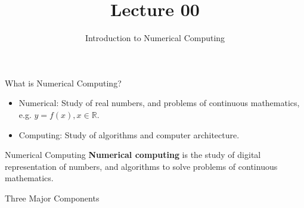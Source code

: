 \documentclass[10pt]{beamer}
\title[Math/CS 375]{Lecture 00}
\subtitle{Introduction to Numerical Computing}
\begin{document}
\begin{frame}
  \titlepage
\end{frame}
\begin{frame}{What is Numerical Computing?}
\begin{itemize}
    \item Numerical: Study of real numbers, and problems of continuous mathematics, e.g. $y=f(x), x\in \mathbb{R}$.\\[5mm]
    \item Computing: Study of algorithms and computer architecture.\\[5mm]
\end{itemize}
\begin{block}{Numerical Computing}
\textbf{Numerical computing} is the study of digital representation of numbers, and algorithms to solve problems of continuous mathematics.    
\end{block}
\end{frame}

\begin{frame}{Three Major Components}
\centering
{}

\end{frame}
\end{document}
